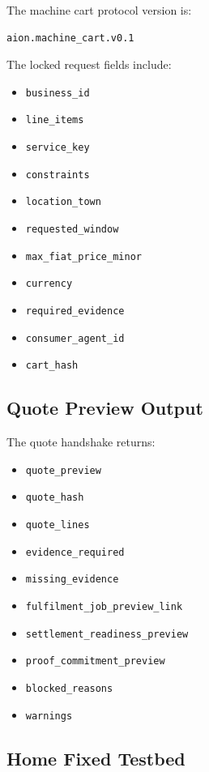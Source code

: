 The machine cart protocol version is:

\begin{verbatim}
aion.machine_cart.v0.1
\end{verbatim}

The locked request fields include:

\begin{itemize}
  \item \texttt{business\_id}
  \item \texttt{line\_items}
  \item \texttt{service\_key}
  \item \texttt{constraints}
  \item \texttt{location\_town}
  \item \texttt{requested\_window}
  \item \texttt{max\_fiat\_price\_minor}
  \item \texttt{currency}
  \item \texttt{required\_evidence}
  \item \texttt{consumer\_agent\_id}
  \item \texttt{cart\_hash}
\end{itemize}

\subsection{Quote Preview Output}

The quote handshake returns:

\begin{itemize}
  \item \texttt{quote\_preview}
  \item \texttt{quote\_hash}
  \item \texttt{quote\_lines}
  \item \texttt{evidence\_required}
  \item \texttt{missing\_evidence}
  \item \texttt{fulfilment\_job\_preview\_link}
  \item \texttt{settlement\_readiness\_preview}
  \item \texttt{proof\_commitment\_preview}
  \item \texttt{blocked\_reasons}
  \item \texttt{warnings}
\end{itemize}

\subsection{Home Fixed Testbed}

